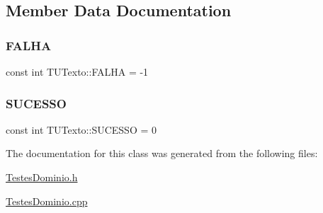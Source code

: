 \subsection{Member Data Documentation}
\mbox{\label{class_t_u_texto_ad225db82ebc02a313957712dbc70abd2}} 
\subsubsection{\texorpdfstring{F\+A\+L\+HA}{FALHA}}
{\footnotesize\ttfamily const int T\+U\+Texto\+::\+F\+A\+L\+HA = -\/1\hspace{0.3cm}{\ttfamily [static]}}

\mbox{\label{class_t_u_texto_a85843f1840647cc1c8dc2606fe03dc36}} 
\subsubsection{\texorpdfstring{S\+U\+C\+E\+S\+SO}{SUCESSO}}
{\footnotesize\ttfamily const int T\+U\+Texto\+::\+S\+U\+C\+E\+S\+SO = 0\hspace{0.3cm}{\ttfamily [static]}}



The documentation for this class was generated from the following files\+:\begin{DoxyCompactItemize}
\item 
\hyperlink{_testes_dominio_8h}{Testes\+Dominio.\+h}\item 
\hyperlink{_testes_dominio_8cpp}{Testes\+Dominio.\+cpp}\end{DoxyCompactItemize}
